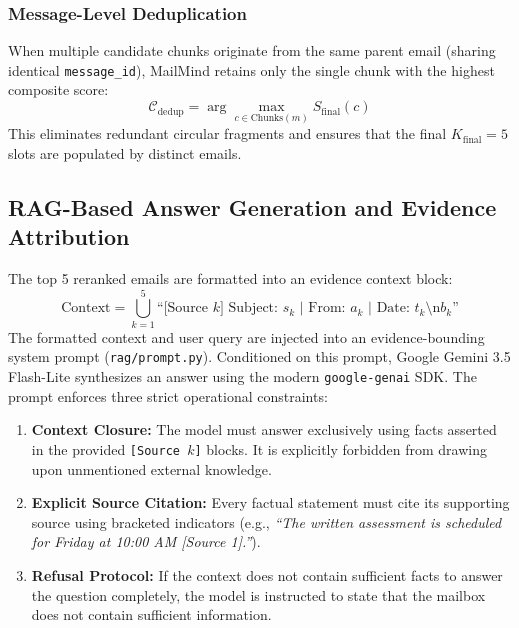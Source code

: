 \documentclass[11pt,a4paper]{article}
\begin{document}
\subsubsection{Message-Level Deduplication}
When multiple candidate chunks originate from the same parent email (sharing identical \texttt{message\_id}), MailMind retains only the single chunk with the highest composite score:
\begin{equation}
    \mathcal{C}_{\text{dedup}} = \arg\max_{c \in \text{Chunks}(m)} S_{\text{final}}(c)
\end{equation}
This eliminates redundant circular fragments and ensures that the final $K_{\text{final}} = 5$ slots are populated by distinct emails.

\subsection{RAG-Based Answer Generation and Evidence Attribution}
The top 5 reranked emails are formatted into an evidence context block:
\begin{equation}
    \text{Context} = \bigcup_{k=1}^5 \text{``[Source } k \text{] Subject: } s_k \text{ | From: } a_k \text{ | Date: } t_k \text{\textbackslash n} b_k \text{''}
\end{equation}
The formatted context and user query are injected into an evidence-bounding system prompt (\texttt{rag/prompt.py}). Conditioned on this prompt, Google Gemini 3.5 Flash-Lite synthesizes an answer using the modern \texttt{google-genai} SDK. The prompt enforces three strict operational constraints:
\begin{enumerate}
    \item \textbf{Context Closure:} The model must answer exclusively using facts asserted in the provided \texttt{[Source $k$]} blocks. It is explicitly forbidden from drawing upon unmentioned external knowledge.
    \item \textbf{Explicit Source Citation:} Every factual statement must cite its supporting source using bracketed indicators (e.g., \textit{``The written assessment is scheduled for Friday at 10:00 AM [Source 1].''}).
    \item \textbf{Refusal Protocol:} If the context does not contain sufficient facts to answer the question completely, the model is instructed to state that the mailbox does not contain sufficient information.
\end{enumerate}
\end{document}
